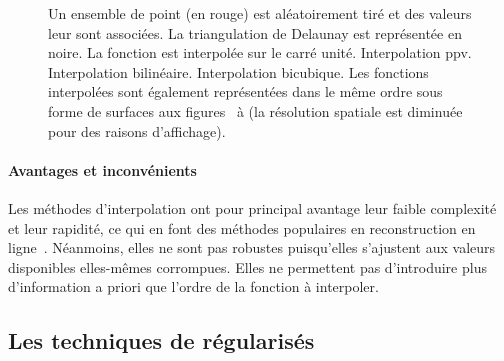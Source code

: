\begin{figure}[h]
    \caption{Un ensemble de point (en rouge) est aléatoirement tiré et des valeurs leur sont associées. La triangulation de Delaunay est représentée en noire. La fonction est interpolée sur le carré unité. \protect{} Interpolation \gls{ppv}. \protect{} Interpolation bilinéaire. \protect{} Interpolation bicubique. Les fonctions interpolées sont également représentées dans le même ordre sous forme de surfaces aux figures~ à  (la résolution spatiale est diminuée pour des raisons d'affichage).
        \protect\label{fig-interpolation}}
\end{figure}

\paragraph{Avantages et inconvénients} Les méthodes d'interpolation ont pour principal avantage leur faible complexité et leur rapidité, ce qui en font des méthodes populaires en reconstruction en ligne~\cite{sibson1981interpreting, cazals2006delaunay, trampert2018ultramicroscopy}. Néanmoins, elles ne sont pas robustes puisqu'elles s'ajustent aux valeurs disponibles elles-mêmes corrompues. Elles ne permettent pas d'introduire plus d'information a priori que l'ordre de la fonction à interpoler.

\subsection{Les techniques de  régularisés}


